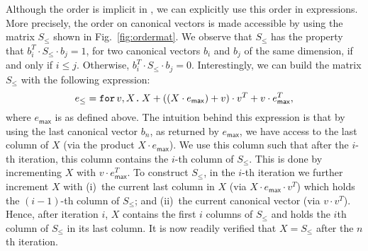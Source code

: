 Although the order is implicit in \langfor, we can explicitly use this order in \langfor expressions. More precisely, the order on canonical vectors is made accessible by
using the matrix $S_\leq$ shown in Fig.~\ref{fig:ordermat}.
We observe that $S_{\leq}$ has the property that $b_i^T\cdot S_{\leq} \cdot b_j=1$, for two canonical vectors $b_i$ and $b_j$ of the same dimension, if and only if $i\leq j$. Otherwise, $b_i^T\cdot S_{\leq} \cdot b_j=0$. 
Interestingly, we can build the matrix $S_{\leq}$ with the following \langfor expression:
$$
e_{\leq}=\texttt{for}\, v,X \texttt{.}\, X + \left((X\cdot e_{\mathsf{max}}) + v \right)\cdot v^T + v\cdot e^T_{\mathsf{max}},
$$
where $e_{\mathsf{max}}$ is as defined above. The intuition behind this expression is that by using the last canonical vector $b_n$, as returned by $e_{\mathsf{max}}$, we have access to the last column of $X$ (via the product $X\cdot e_{\mathsf{max}}$). We use this column such that after the $i$-th iteration, this column contains the $i$-th column of $S_{\leq}$. This is done by incrementing $X$ with $v\cdot e_{\mathsf{max}}^T$.
To construct $S_{\leq}$, in the $i$-th iteration we further increment $X$ with 
(i)~the current last column in $X$ (via $X\cdot e_{\mathsf{max}}\cdot v^T$) which holds
the $(i-1)$-th column of $S_{\leq}$; and (ii)~the current canonical vector (via $v\cdot v^T$). Hence, after iteration $i$, $X$ contains the first $i$ columns of $S_{\leq}$ and holds the $i$th column of $S_{\leq}$ in its last column. It is now readily verified that $X=S_{\leq}$ after the $n$th iteration.


